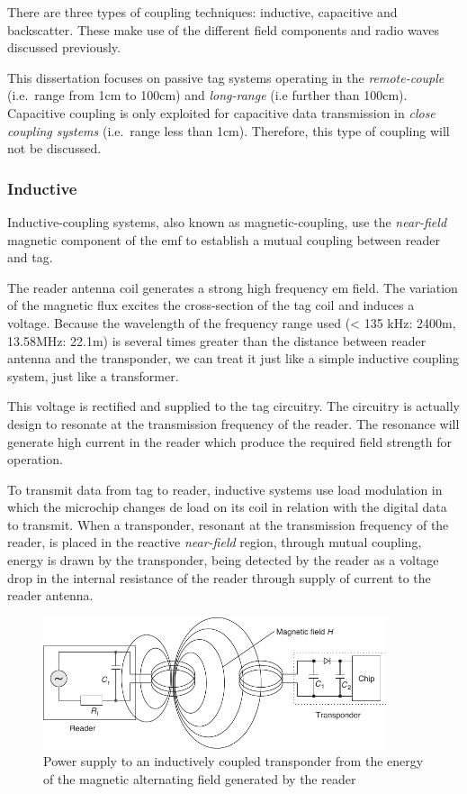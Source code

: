 There are three types of coupling techniques: inductive, capacitive and backscatter. These make use of the different field components and radio waves discussed previously.

This dissertation focuses on passive tag systems operating in the \emph{remote-couple} (i.e.\ range from 1cm to 100cm) and \emph{long-range} (i.e further than 100cm).
Capacitive coupling is only exploited for capacitive data transmission in \emph{close coupling systems} (i.e.\ range less than 1cm). Therefore, this type of coupling will not be discussed.

\subsubsection{Inductive}

Inductive-coupling systems, also known as magnetic-coupling, use the \emph{near-field} magnetic component of the \ac{emf} to establish a mutual coupling between reader and tag.

The reader antenna coil generates a strong high frequency \ac{em} field. The variation of the magnetic flux excites the cross-section of the tag coil and induces a voltage.
Because the wavelength of the frequency range used (< 135 kHz: 2400m, 13.58MHz: 22.1m) is several times greater than the distance between reader antenna and the transponder, we can treat it just like a simple inductive coupling system, just like a transformer.

This voltage is rectified and supplied to the tag circuitry.
The circuitry is actually design to resonate at the transmission frequency of the reader. The resonance will generate high current in the reader which produce the required field strength for operation.

To transmit data from tag to reader, inductive systems use load modulation in which the microchip changes de load on its coil in relation with the digital data to transmit. When a transponder, resonant at the transmission frequency of the reader, is placed in the reactive \emph{near-field} region, through mutual coupling, energy is drawn by the transponder, being detected by the reader as a voltage drop in the internal resistance of the reader through supply of current to the reader antenna.

\begin{figure}[!ht]
    \centering
    \includegraphics[width=0.9\textwidth]{./figs/02-state-of-the-art/loadmodulation.pdf}
    \caption{Power supply to an inductively coupled transponder from the energy of the magnetic alternating field generated by the reader~\cite{finkenzellerRFIDHandbookFundamentals2003}} 
    \label{fig:loadmodulation}
\end{figure}

